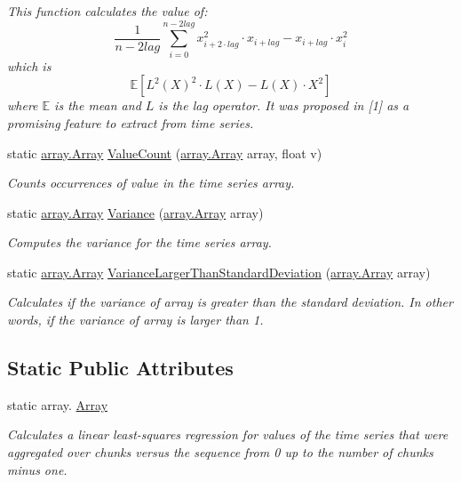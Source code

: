 \begin{DoxyCompactItemize}
\begin{DoxyCompactList}\small\item\em This function calculates the value of\+: \[ \frac{1}{n-2lag} \sum_{i=0}^{n-2lag} x_{i + 2 \cdot lag}^2 \cdot x_ { i + lag } - x_{i + lag} \cdot x_ { i }^2 \] which is \[ \mathbb{E}[L^2(X)^2 \cdot L(X) - L(X) \cdot X^2] \] where $ \mathbb{E} $ is the mean and $ L $ is the lag operator. It was proposed in \mbox{[}1\mbox{]} as a promising feature to extract from time series. \end{DoxyCompactList}\item 
static \mbox{\hyperlink{classkhiva_1_1array_1_1_array}{array.\+Array}} \mbox{\hyperlink{classkhiva_1_1features_1_1_features_ad5c7c9e151ece61006ae5d7102cbaac0}{Value\+Count}} (\mbox{\hyperlink{classkhiva_1_1array_1_1_array}{array.\+Array}} array, float v)
\begin{DoxyCompactList}\small\item\em Counts occurrences of value in the time series array. \end{DoxyCompactList}\item 
static \mbox{\hyperlink{classkhiva_1_1array_1_1_array}{array.\+Array}} \mbox{\hyperlink{classkhiva_1_1features_1_1_features_a3f345f5e1ba5db83f4aae546bcc4688e}{Variance}} (\mbox{\hyperlink{classkhiva_1_1array_1_1_array}{array.\+Array}} array)
\begin{DoxyCompactList}\small\item\em Computes the variance for the time series array. \end{DoxyCompactList}\item 
static \mbox{\hyperlink{classkhiva_1_1array_1_1_array}{array.\+Array}} \mbox{\hyperlink{classkhiva_1_1features_1_1_features_a2714c653b8dfcd69ddef827c6ce6afd7}{Variance\+Larger\+Than\+Standard\+Deviation}} (\mbox{\hyperlink{classkhiva_1_1array_1_1_array}{array.\+Array}} array)
\begin{DoxyCompactList}\small\item\em Calculates if the variance of array is greater than the standard deviation. In other words, if the variance of array is larger than 1. \end{DoxyCompactList}\end{DoxyCompactItemize}
\subsection*{Static Public Attributes}
\begin{DoxyCompactItemize}
\item 
static array. \mbox{\hyperlink{classkhiva_1_1features_1_1_features_a055f8745244a303a358d35407c8200c5}{Array}}
\begin{DoxyCompactList}\small\item\em Calculates a linear least-\/squares regression for values of the time series that were aggregated over chunks versus the sequence from 0 up to the number of chunks minus one. \end{DoxyCompactList}\end{DoxyCompactItemize}


